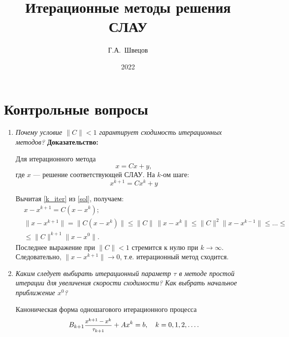 \documentclass[12pt, a4paper]{article}
\title{Итерационные методы решения СЛАУ}
\author{Г.А.~Швецов}
\date{2022}
\begin{document}
	\newcommand{\pl}{\partial}
	\maketitle
	
	\tableofcontents
	
	\newpage

	\section{Контрольные вопросы}
	\begin{enumerate}
		\item \textit{Почему условие $\|C\|<1$ гарантирует сходимость итерационных методов?}
		\smallskip
		\textbf{Доказательство:}
		
		Для итерационного метода
		\begin{equation}
			\label{sol}
			x = Cx + y,
		\end{equation}
		где $x$ --- решение соответствующей СЛАУ. На $k$-ом шаге:
		\begin{equation}
			\label{k_iter}
			x^{k+1} = C x^k + y
		\end{equation}
		
		Вычитая \eqref{k_iter} из \eqref{sol}, получаем:
		\begin{eqnarray*}
			& x - x^{k+1} = C(x - x^k); \\
			& \|x - x^{k+1}\| = \|C(x - x^k)\| \le \|C\| \, \|x - x^k\| \le \|C\|^2 \|x - x^{k-1}\| \le \dots \le \\
			& \le \|C\|^{k+1} \|x - x^0\|.
		\end{eqnarray*}
		Последнее выражение при $\|C\| < 1$ стремится к нулю при $k \rightarrow \infty$. Следовательно, $\|x - x^{k+1}\| \rightarrow 0$, т.е. итерационный метод сходится.
		\smallskip
		
		\item \textit{Каким следует выбирать итерационный параметр $\tau$ в методе простой итерации для увеличения скорости сходимости? Как выбрать начальное приближение $x^0$?}
		\smallskip
		
		Каноническая форма одношагового итерационного процесса
		\begin{equation}
	B_{k+1} \hbox{\footnotesize$\displaystyle\frac{x^{k+1}-x^k}{\tau_{k+1}}$}+Ax^k=b,\quad k=0,1,2,\dots.
	\label{iterproc}
		\end{equation}
	

\end{enumerate}
\end{document}
